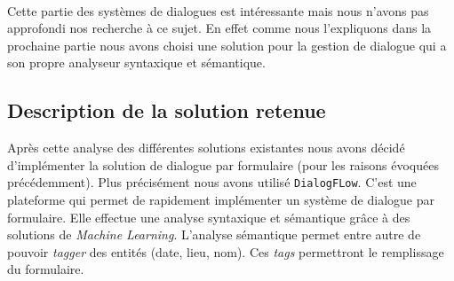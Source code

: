 ~\\\indent
Cette partie des systèmes de dialogues est intéressante mais nous n'avons pas approfondi nos recherche à ce sujet. En effet comme nous l'expliquons dans la prochaine partie nous avons choisi une solution pour la gestion de dialogue qui a son propre analyseur syntaxique et sémantique.

\subsection{Description de la solution retenue}
Après cette analyse des différentes solutions existantes nous avons décidé d'implémenter la solution de dialogue par formulaire (pour les raisons évoquées précédemment). Plus précisément nous avons utilisé \texttt{DialogFLow}. C'est une plateforme qui permet de rapidement implémenter un système de dialogue par formulaire. Elle effectue une analyse syntaxique et sémantique grâce à des solutions de \textit{Machine Learning}. L'analyse sémantique permet entre autre de pouvoir \emph{tagger} des entités (date, lieu, nom). Ces \emph{tags} permettront le remplissage du formulaire.